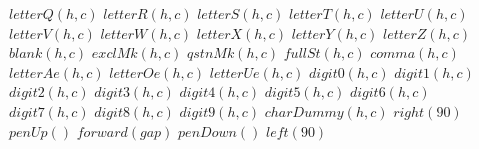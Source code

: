 \documentclass[a4paper,10pt]{article}
\begin{document}
\begin{algorithm}
\begin{algorithmic}[5]
      \STATE \(letterQ(h,c)\)
      \STATE \(letterR(h,c)\)
      \STATE \(letterS(h,c)\)
      \STATE \(letterT(h,c)\)
      \STATE \(letterU(h,c)\)
      \STATE \(letterV(h,c)\)
      \STATE \(letterW(h,c)\)
      \STATE \(letterX(h,c)\)
      \STATE \(letterY(h,c)\)
      \STATE \(letterZ(h,c)\)
      \STATE \(blank(h,c)\)
      \STATE \(exclMk(h,c)\)
      \STATE \(qstnMk(h,c)\)
      \STATE \(fullSt(h,c)\)
      \STATE \(comma(h,c)\)
      \STATE \(letterAe(h,c)\)
      \STATE \(letterOe(h,c)\)
      \STATE \(letterUe(h,c)\)
      \STATE \(digit0(h,c)\)
      \STATE \(digit1(h,c)\)
      \STATE \(digit2(h,c)\)
      \STATE \(digit3(h,c)\)
      \STATE \(digit4(h,c)\)
      \STATE \(digit5(h,c)\)
      \STATE \(digit6(h,c)\)
      \STATE \(digit7(h,c)\)
      \STATE \(digit8(h,c)\)
      \STATE \(digit9(h,c)\)
    \ELSE
      \STATE \(charDummy(h,c)\)
    \ENDIF
    \STATE \(right(90)\)
    \STATE \(penUp()\)
    \STATE \(forward(gap)\)
    \STATE \(penDown()\)
    \STATE \(left(90)\)
  \ENDFOR

\end{algorithmic}
\end{algorithm}


\STATE {}
\end{document}
